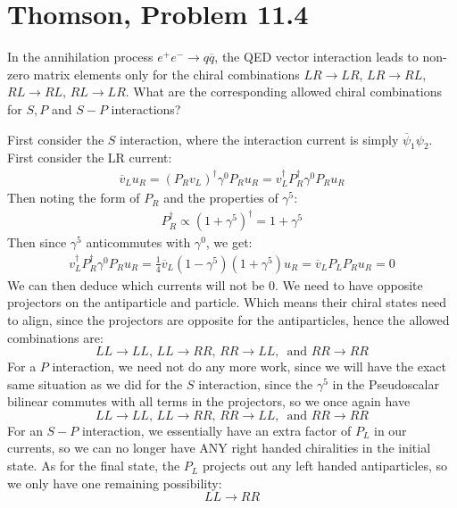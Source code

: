 \documentclass[12pt]{article}
\begin{document}
\section{Thomson, Problem 11.4}
\begin{problem}
  In the annihilation process $e^+e^-\to  q\overline{q}$, the QED vector interaction leads to non-zero matrix elements only for the chiral combinations $LR\to LR$, $LR\to RL$, $RL\to RL$, $RL\to LR$. What are the corresponding allowed chiral combinations for $S,P$ and $S-P$ interactions?
\end{problem}
First consider the $S$ interaction, where the interaction current is simply $\overline{\psi}_1\psi_2$. First consider the LR current:
\begin{align*}
  \overline{v}_L u_R={(P_R v_L)}^\dag\gamma^0P_R u_R
  =v_L^\dag P_R^\dag\gamma^0P_R u_R
\end{align*}
Then noting the form of $P_R$ and the properties of $\gamma^5$:
\begin{align*}
  P_R^\dag\propto{(1+\gamma^5)}^\dag=1+\gamma^5
\end{align*}
Then since $\gamma^5$ anticommutes with $\gamma^0$, we get:
\begin{align*}
  v_L^\dag P_R^\dag\gamma^0P_R u_R=
  \frac14\overline{v}_L(1-\gamma^5)(1+\gamma^5)u_R=
  \overline{v}_L P_L P_R u_R=0
\end{align*}
We can then deduce which currents will not be 0. We need to have opposite projectors on the antiparticle and particle. Which means their chiral states need to align, since the projectors are opposite for the antiparticles, hence the allowed combinations are:
\begin{equation}
  \label{eq:p4a}
  \boxed{LL\to LL,\, LL\to RR,\, RR\to LL,\, \text{ and } RR\to RR}
\end{equation}
For a $P$ interaction, we need not do any more work, since we will have the exact same situation as we did for the $S$ interaction, since the $\gamma^5$ in the Pseudoscalar bilinear commutes with all terms in the projectors, so we once again have
\begin{equation}
  \label{eq:p4b}
  \boxed{LL\to LL,\, LL\to RR,\, RR\to LL,\, \text{ and } RR\to RR}
\end{equation}
For an $S-P$ interaction, we essentially have an extra factor of $P_L$ in our currents, so we can no longer have ANY right handed chiralities in the initial state. As for the final state, the $P_L$ projects out any left handed antiparticles, so we only have one remaining possibility:
\begin{equation}
  \label{eq:p4c}
  \boxed{LL\to RR}
\end{equation}
\newpage
\end{document}
